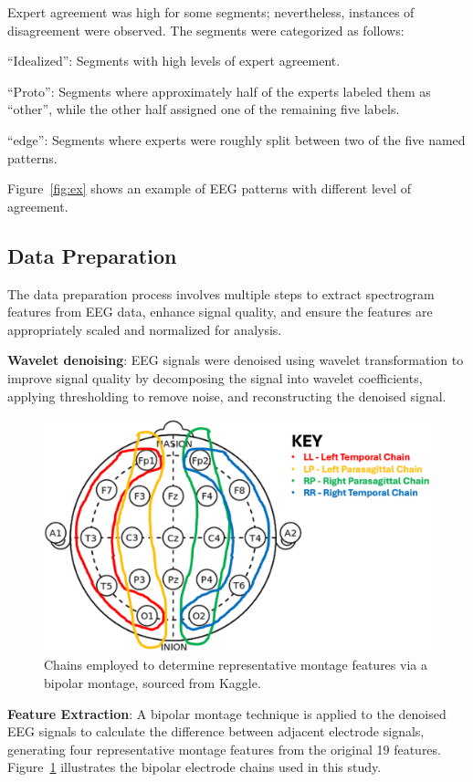 \documentclass[conference]{IEEEtran}
\let\proglang=\textsf
\let\pkg=\texttt
\begin{document}
Expert agreement was high for some segments; nevertheless, instances of
disagreement were observed. The segments were categorized as follows:
\begin{enumerate*}[label = (\roman*)]
\item ``Idealized'': Segments with high levels of expert agreement.
\item ``Proto'': Segments where approximately half of the experts labeled them
as ``other'', while the other half assigned one of the remaining five labels.
\item ``edge'': Segments where experts were roughly split between two of the
five named patterns.
\end{enumerate*}
Figure~\ref{fig:ex} shows an example of EEG patterns with different level of
agreement.


\subsection{Data Preparation}


The data preparation process involves multiple steps to extract spectrogram
features from EEG data, enhance signal quality, and ensure the features are
appropriately scaled and normalized for analysis.


\textbf{Wavelet denoising}: EEG signals were denoised using wavelet
transformation to improve signal quality by decomposing the signal into wavelet
coefficients, applying thresholding to remove noise, and reconstructing the
denoised signal.


\begin{figure}[bp]
\centering
\includegraphics[width=.45\textwidth]{inion}
\caption{Chains employed to determine representative montage features via
a bipolar montage, sourced from Kaggle.}
\label{fig:inion}
\end{figure}


\textbf{Feature Extraction}: A bipolar montage technique is applied to the
denoised EEG signals to calculate the difference between adjacent electrode
signals, generating four representative montage features from the original 19
features. Figure~\ref{fig:inion} illustrates the bipolar electrode chains used
in this study.
\end{document}
